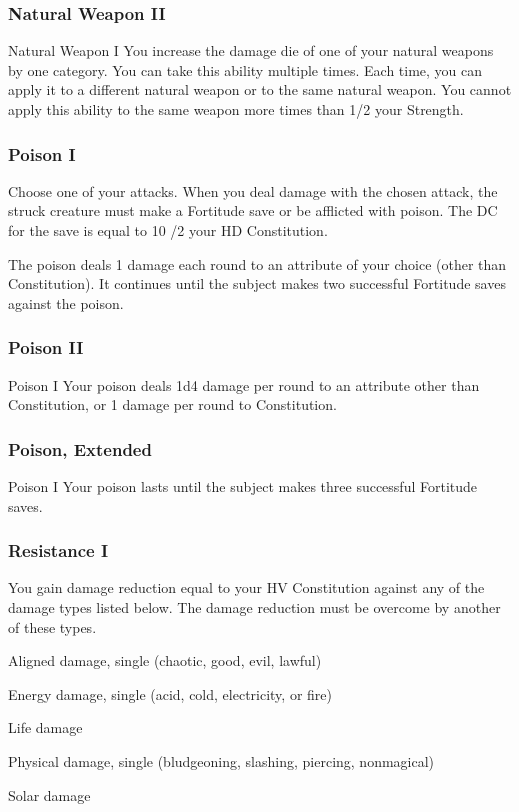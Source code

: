 \subsubsection{Natural Weapon II}
\featpre Natural Weapon I
\featben You increase the damage die of one of your natural weapons by one category.
 You can take this ability multiple times. Each time, you can apply it to a different natural weapon or to the same natural weapon. You cannot apply this ability to the same weapon more times than 1/2 your Strength. 

\subsubsection{Poison I}
Choose one of your attacks.
\featben When you deal damage with the chosen attack, the struck creature must make a Fortitude save or be afflicted with poison. The DC for the save is equal to 10 /2 your HD \add Constitution.
\par The poison deals 1 damage each round to an attribute of your choice (other than Constitution). It continues until the subject makes two successful Fortitude saves against the poison.

\subsubsection{Poison II}
\featpre Poison I
\featben Your poison deals 1d4 damage per round to an attribute other than Constitution, or 1 damage per round to Constitution.

\subsubsection{Poison, Extended}
\featpre Poison I
\featben Your poison lasts until the subject makes three successful Fortitude saves.

\subsubsection{Resistance I}
\featben You gain damage reduction equal to your HV \add Constitution against any of the damage types listed below. The damage reduction must be overcome by another of these types.
\begin{itemize*}
    \item Aligned damage, single (chaotic, good, evil, lawful)
    \item Energy damage, single (acid, cold, electricity, or fire)
    \item Life damage
    \item Physical damage, single (bludgeoning, slashing, piercing, nonmagical)
    \item Solar damage
\end{itemize*}

